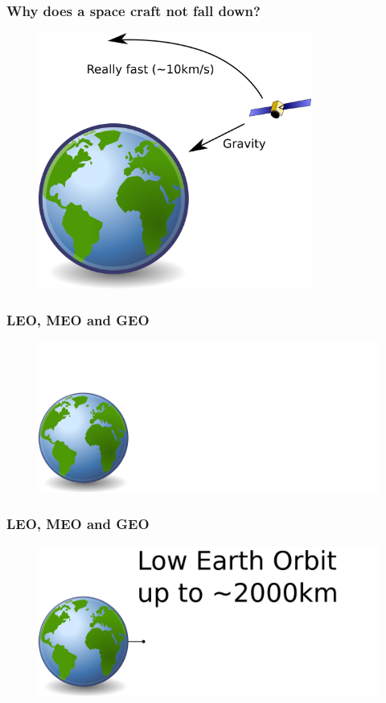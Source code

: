 \documentclass[12pt,utf8,notheorems,compress]{beamer}
\begin{document}
\begin{frame}
  \frametitle{Why does a space craft not fall down?}
  \begin{figure}[b]
    \centering
    \includegraphics[width=0.8\textwidth]{gravity2.png}
  \end{figure}
\end{frame}

\begin{frame}
  \frametitle{LEO, MEO and GEO}
  \begin{figure}[!ht]
    \centering
    \includegraphics[width=\textwidth]{orbit1.png}
  \end{figure}
\end{frame}

\begin{frame}
  \frametitle{LEO, MEO and GEO}
  \begin{figure}[!ht]
    \centering
    \includegraphics[width=\textwidth]{orbit2.png}
  \end{figure}
\end{frame}
\end{document}
